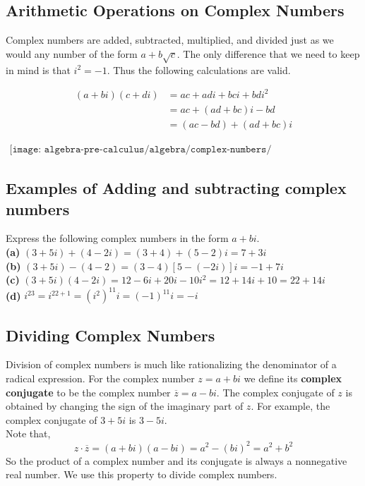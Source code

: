 \subsection{Arithmetic Operations on Complex Numbers}

Complex numbers are added, subtracted, multiplied, and divided just as we would any
number of the form $a+b\sqrt{c}$. The only difference that we need to keep in mind is that $i^2=-1$. Thus the following calculations are valid.

\begin{align*}
    (a+bi)(c+di) & = ac+adi+bci+bdi^2 \\
                 & =ac+(ad+bc)i-bd    \\
                 & = (ac-bd)+(ad+bc)i
\end{align*}

\begin{align*}
    \texttt{[image: algebra-pre-calculus/algebra/complex-numbers/arithmetic\_operations\_complex\_numbers.png]}
\end{align*}

\subsection{Examples of Adding and subtracting complex numbers}
Express the following complex numbers in the form $a+bi$. \\
\textbf{(a)} $(3+5i)+(4-2i)=(3+4)+(5-2)i=7+3i$ \\
\textbf{(b)} $(3+5i)-(4-2)=(3-4)[5-(-2i)]i=-1+7i$ \\
\textbf{(c)} $(3+5i)(4-2i) = 12-6i+20i-10i^2=12+14i+10=22+14i$ \\
\textbf{(d)} $i^{23}=i^{22+1}=(i^2)^{11}i=(-1)^{11}i=-i$ \\

\subsection{Dividing Complex Numbers}
Division of complex numbers is much like rationalizing the denominator of a radical expression. For the complex number $z=a+bi$ we define its \textbf{complex conjugate} to be the complex number $\overline{z}=a-bi$. The complex conjugate of $z$ is obtained by changing the sign of the imaginary part of $z$. For example, the complex conjugate of $3+5i$ is $3-5i$. \\
Note that, $$z\cdot\overline{z}=(a+bi)(a-bi)=a^2-(bi)^2=a^2+b^2$$
So the product of a complex number and its conjugate is always a nonnegative real number. We use this property to divide complex numbers.

